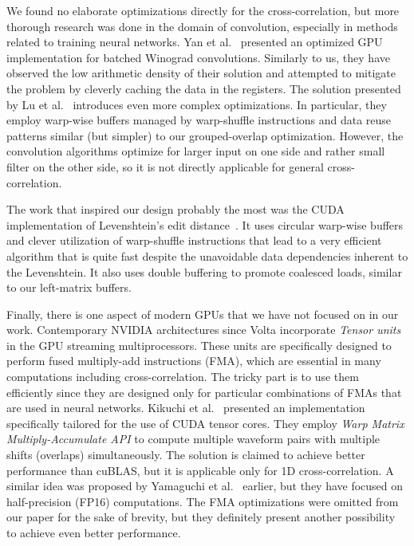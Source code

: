 We found no elaborate optimizations directly for the cross-correlation, but more thorough research was done in the domain of convolution, especially in methods related to training neural networks. Yan et al.~\cite{yan2020optimizing} presented an optimized GPU implementation for batched Winograd convolutions. Similarly to us, they have observed the low arithmetic density of their solution and attempted to mitigate the problem by cleverly caching the data in the registers. The solution presented by Lu et al.~\cite{lu2021optimizing} introduces even more complex optimizations. In particular, they employ warp-wise buffers managed by warp-shuffle instructions and data reuse patterns similar (but simpler) to our grouped-overlap optimization. However, the convolution algorithms optimize for larger input on one side and rather small filter on the other side, so it is not directly applicable for general cross-correlation.

The work that inspired our design probably the most was the CUDA implementation of Levenshtein's edit distance~\cite{paper:levenstein}. It uses circular warp-wise buffers and clever utilization of warp-shuffle instructions that lead to a very efficient algorithm that is quite fast despite the unavoidable data dependencies inherent to the Levenshtein. It also uses double buffering to promote coalesced loads, similar to our left-matrix buffers.

Finally, there is one aspect of modern GPUs that we have not focused on in our work. Contemporary NVIDIA architectures since Volta incorporate \emph{Tensor units} in the GPU streaming multiprocessors. These units are specifically designed to perform fused multiply-add instructions (FMA), which are essential in many computations including cross-correlation. The tricky part is to use them efficiently since they are designed only for particular combinations of FMAs that are used in neural networks. Kikuchi et al.~\cite{kikuchi2022calculation} presented an implementation specifically tailored for the use of CUDA tensor cores. They employ \emph{Warp Matrix Multiply-Accumulate API} to compute multiple waveform pairs with multiple shifts (overlaps) simultaneously. The solution is claimed to achieve better performance than cuBLAS, but it is applicable only for 1D cross-correlation. A similar idea was proposed by Yamaguchi et al.~\cite{Yamaguchi2019} earlier, but they have focused on half-precision (FP16) computations. The FMA optimizations were omitted from our paper for the sake of brevity, but they definitely present another possibility to achieve even better performance.


